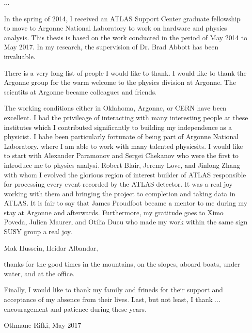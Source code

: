 ...

In the spring of 2014, I received an ATLAS Support Center graduate fellowship to move to Argonne National Laboratory 
to work on hardware and physics analysis.
This thesis is based on the work conducted in the period of May 2014 to May 2017. 
In my research, the supervision of Dr. Brad Abbott has been invaluable. 


There is a very long list of people I would like to thank. 
I would like to thank the Argonne group for the warm welcome to the physics division at Argonne.
The scientits at Argonne became colleagues and friends. 

The working conditions either in Oklahoma, Argonne, or CERN have been excellent. 
I had the privileage of interacting with many interesting people at these institutes which I contributed 
significantly to building my independence as a physicist. 
I habe been particularly fortunate of being part of Argonne National Laboratory.
where I am able to work with many talented physicsits. 
I would like to start with Alexander Paramonov and Sergei Chekanov who were the first to introduce me to physics analysi.
Robert Blair, Jeremy Love, and Jinlong Zhang with whom I evolved the glorious region of interest builder of ATLAS 
responsible for processing every event recorded by the ATLAS detector. 
It was a real joy working with them and bringing the project to completion and taking data in ATLAS.
It is fair to say that James Proudfoot became a mentor to me during my stay at Argonne and afterwards.
Furthermore, my gratitude goes to Ximo Poveda, Julien Maurer, and Otilia Ducu who made my work within the same sign SUSY 
group a real joy.

Mak Hussein, Heidar Albandar, 


thanks for the good times in the mountains, on the slopes, aboard boats, under water, and at the office.

Finally, I would like to thank my family and frineds for their support and acceptance of my absence from their lives.
Last, but not least, I thank ... encouragement and patience during these years. 


Othmane Rifki, May 2017
